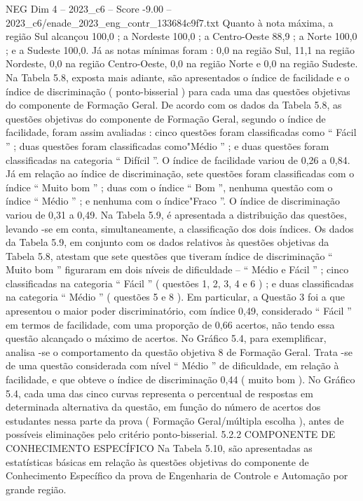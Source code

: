 \begin{textsample}{NEG Dim 4 – 2023\_c6 – Score -9.00 – 2023\_c6/enade\_2023\_eng\_contr\_133684c9f7.txt}
Quanto à nota máxima, a região Sul alcançou 100,0 ; a Nordeste 100,0 ; a Centro-Oeste 88,9 ; a Norte 100,0 ; e a Sudeste 100,0.
Já as notas mínimas foram : 0,0 na região Sul, 11,1 na região Nordeste, 0,0 na região Centro-Oeste, 0,0 na região Norte e 0,0 na região Sudeste.
Na Tabela 5.8, exposta mais adiante, são apresentados o índice de facilidade e o índice de discriminação ( ponto-bisserial ) para cada uma das questões objetivas do componente de Formação Geral.
De acordo com os dados da Tabela 5.8, as questões objetivas do componente de Formação Geral, segundo o índice de facilidade, foram assim avaliadas : cinco questões foram classificadas como “ Fácil ” ; duas questões foram classificadas como"Médio ” ; e duas questões foram classificadas na categoria “ Difícil ”.
O índice de facilidade variou de 0,26 a 0,84.
Já em relação ao índice de discriminação, sete questões foram classificadas com o índice “ Muito bom ” ; duas com o índice “ Bom ”, nenhuma questão com o índice “ Médio ” ; e nenhuma com o índice"Fraco ”.
O índice de discriminação variou de 0,31 a 0,49.
Na Tabela 5.9, é apresentada a distribuição das questões, levando -se em conta, simultaneamente, a classificação dos dois índices.
Os dados da Tabela 5.9, em conjunto com os dados relativos às questões objetivas da Tabela 5.8, atestam que sete questões que tiveram índice de discriminação “ Muito bom ” figuraram em dois níveis de dificuldade – “ Médio e Fácil ” ; cinco classificadas na categoria “ Fácil ” ( questões 1, 2, 3, 4 e 6 ) ; e duas classificadas na categoria “ Médio ” ( questões 5 e 8 ).
Em particular, a Questão 3 foi a que apresentou o maior poder discriminatório, com índice 0,49, considerado “ Fácil ” em termos de facilidade, com uma proporção de 0,66 acertos, não tendo essa questão alcançado o máximo de acertos.
No Gráfico 5.4, para exemplificar, analisa -se o comportamento da questão objetiva 8 de Formação Geral.
Trata -se de uma questão considerada com nível “ Médio ” de dificuldade, em relação à facilidade, e que obteve o índice de discriminação 0,44 ( muito bom ).
No Gráfico 5.4, cada uma das cinco curvas representa o percentual de respostas em determinada alternativa da questão, em função do número de acertos dos estudantes nessa parte da prova ( Formação Geral/múltipla escolha ), antes de possíveis eliminações pelo critério ponto-bisserial. 5.2.2 COMPONENTE DE CONHECIMENTO ESPECÍFICO Na Tabela 5.10, são apresentadas as estatísticas básicas em relação às questões objetivas do componente de Conhecimento Específico da prova de Engenharia de Controle e Automação por grande região.

\end{textsample}
